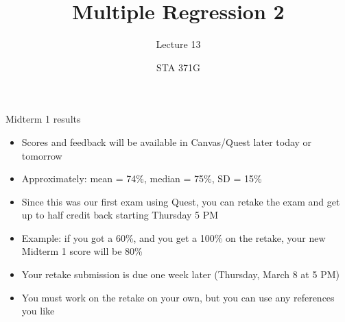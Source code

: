 \documentclass{beamer}\usepackage[]{graphicx}\usepackage[]{color}
\title{Multiple Regression 2}
\subtitle{Lecture 13}
\author{STA 371G}
\begin{document}
  
  
  

  \frame{\maketitle}



  \begin{darkframes}
    \begin{frame}{Midterm 1 results}
      \begin{itemize}[<+->]
        \item Scores and feedback will be available in Canvas/Quest later today or tomorrow
        \item Approximately: mean = 74\%, median = 75\%, SD = 15\%
        \item Since this was our first exam using Quest, you can retake the exam and get up to half credit back starting Thursday 5 PM
        \item Example: if you got a 60\%, and you get a 100\% on the retake, your new Midterm 1 score will be 80\%
        \item Your retake submission is due one week later (Thursday, March 8 at 5 PM)
        \item You must work on the retake on your own, but you can use any references you like
      \end{itemize}
    \end{frame}


\end{darkframes}
\end{document}
